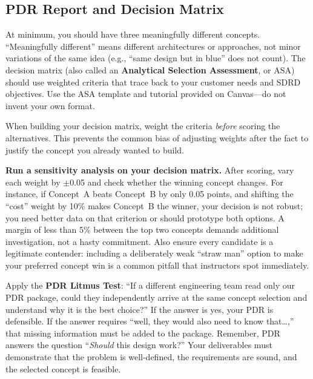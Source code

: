 \subsection{PDR Report and Decision Matrix}

\begin{faqbox}
At minimum, you should have three meaningfully different concepts. ``Meaningfully different'' means different architectures or approaches, not minor variations of the same idea (e.g., ``same design but in blue'' does not count). The decision matrix (also called an \textbf{Analytical Selection Assessment}, or ASA) should use weighted criteria that trace back to your customer needs and SDRD objectives. Use the ASA template and tutorial provided on Canvas---do not invent your own format.
\end{faqbox}

\begin{tipbox}
When building your decision matrix, weight the criteria \textit{before} scoring the alternatives. This prevents the common bias of adjusting weights after the fact to justify the concept you already wanted to build.
\end{tipbox}

\begin{protip}
\textbf{Run a sensitivity analysis on your decision matrix.} After scoring, vary each weight by $\pm$0.05 and check whether the winning concept changes. For instance, if Concept~A beats Concept~B by only 0.05 points, and shifting the ``cost'' weight by 10\% makes Concept~B the winner, your decision is not robust; you need better data on that criterion or should prototype both options. A margin of less than 5\% between the top two concepts demands additional investigation, not a hasty commitment. Also ensure every candidate is a legitimate contender: including a deliberately weak ``straw man'' option to make your preferred concept win is a common pitfall that instructors spot immediately.
\end{protip}

\begin{faqbox}
Apply the \textbf{PDR Litmus Test}: ``If a different engineering team read only our PDR package, could they independently arrive at the same concept selection and understand why it is the best choice?'' If the answer is yes, your PDR is defensible. If the answer requires ``well, they would also need to know that\ldots,'' that missing information must be added to the package. Remember, PDR answers the question ``\textit{Should} this design work?'' Your deliverables must demonstrate that the problem is well-defined, the requirements are sound, and the selected concept is feasible.
\end{faqbox}
